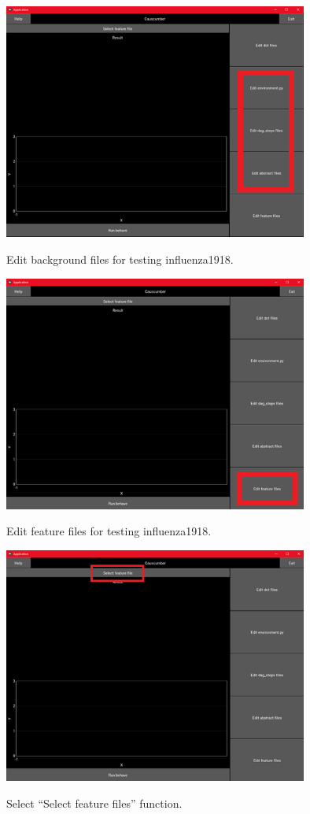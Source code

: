 \begin{figure}[H]
	\centering
	\includegraphics[width=10cm]{figures/influenzaTestProcess8.png}\\
	\caption{Edit background files for testing influenza1918.}
	\label{fig:figure26}
\end{figure}
\begin{figure}[H]
	\centering
	\includegraphics[width=10cm]{figures/influenzaTestProcess9.png}\\
	\caption{Edit feature files for testing influenza1918.}
	\label{fig:figure27}
\end{figure}
\begin{figure}[H]
	\centering
	\includegraphics[width=10cm]{figures/influenzaTestProcess13.png}\\
	\caption{Select “Select feature files” function.}
	\label{fig:figure31}
\end{figure}
